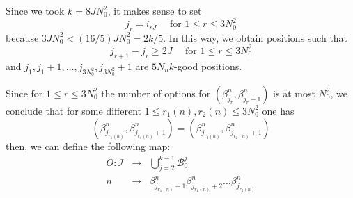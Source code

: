 \documentclass[12pt]{amsart}
\theoremstyle{plain} %
\theoremstyle{definition} %
\numberwithin{equation}{section}
\begin{document}
Since we took $k=8JN_0^2$, it makes sense to set  
$$j_r=i_{rJ} \quad \textrm{ for } 1\leq r\leq 3N_0^2$$
because $3JN_0^2<(16/5)JN_0^2= 2k/5$. In this way, we obtain positions such that 
$$j_{r+1}-j_r\geq 2J  \quad \textrm{ for } 1\leq r\leq 3N_0^2$$
and $j_1, j_1+1, \dots, j_{3N_0^2}, j_{3N_0^2}+1$ are $5N_nk$-good positions.

Since for $1\leq r\leq 3N_0^2$ the number of options for $(\beta^n_{j_r},\beta^n_{j_r+1})$ is at most $N_0^2$, we conclude that for some different $1\leq r_1(n),r_2(n)\leq 3N_0^2$ one has 
 $$(\beta^n_{j_{r_1(n)}},\beta^n_{j_{r_1(n)}+1})=(\beta^n_{j_{r_2(n)}},\beta^n_{j_{r_2(n)}+1})$$ 
then, we can define the following map:
\begin{eqnarray*}
   O: \mathcal{I} &\rightarrow& \bigcup\limits_{j=2}^{k-1}\mathcal{B}_0^j \\
   n &\rightarrow& \beta^n_{j_{r_1(n)}+1}\beta^n_{j_{r_1(n)}+2}\dots \beta^n_{j_{r_2(n)}}
\end{eqnarray*}
\end{document}
